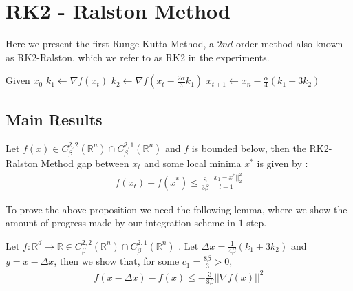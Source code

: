 \section{RK2 - Ralston Method}

Here we present the first Runge-Kutta Method, a $2nd$ order method also known as RK2-Ralston, which we refer to as RK2 in the experiments.

\begin{algorithmic}
\STATE Given $x_0$
  \STATE $k_1 \gets \nabla f(x_t)$
  \STATE $k_2 \gets \nabla f(x_t - \frac{2\alpha}{3} k_1) $
  \STATE $x_{t+1} \gets x_n - \frac{\alpha}{4}(k_1 + 3 k_2)$
\ENDFOR
\end{algorithmic}


\subsection{Main Results}
\begin{thm} Let $f(x) \in C_{\beta}^{2,2}( \mathbb{R}^n) \cap  C_{\beta}^{2,1}( \mathbb{R}^n)$ and $f$ is bounded below, then the RK2-Ralston Method gap between $x_t$ and some local minima $x^*$ is given by :
\begin{align*}
f(x_t) - f(x^*) \leq \frac{8}{3 \beta} \frac{ || x_1 - x^* ||_2^2}{t-1}
\end{align*}
\end{thm}

To prove the above proposition we need the following lemma, where we show the amount of progress made by our integration scheme in $1$ step.
\begin{lemma}
Let $f : \mathbb{R}^d \rightarrow \mathbb{R} \in C_{\beta}^{2,2}( \mathbb{R}^n) \cap  C_{\beta}^{2,1}( \mathbb{R}^n) $  . Let $\Delta x =  \frac{1}{4\beta}(k_1 + 3k_2)$ and $ y  = x - \Delta x$, then  we show that, for some $c_1= \frac{8\beta}{3} >0 $,
\begin{align}
f(x - \Delta x ) - f(x) \leq - \frac{3}{8 \beta} || \nabla f(x) ||^2
\end{align}
\end{lemma}

